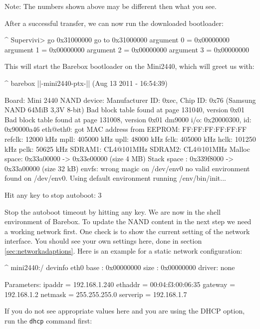 Note: The numbers shown above may be different then what you see.

After a successful transfer, we can now run the downloaded bootloader:

\begin{ptxshell}[escapechar=|]{^}
Supervivi>  go 0x31000000
go to 0x31000000
  argument 0 = 0x00000000
  argument 1 = 0x00000000
  argument 2 = 0x00000000
  argument 3 = 0x00000000
\end{ptxshell}

This will start the Barebox bootloader on the Mini2440, which will
greet us with:

\begin{ptxshell}[escapechar=|]{^}
barebox |\ptxBareboxRev |-mini2440-ptx-|\releasenumber| (Aug 13 2011 - 16:54:39)

Board: Mini 2440
NAND device: Manufacturer ID: 0xec, Chip ID: 0x76 (Samsung NAND 64MiB 3,3V 8-bit)
Bad block table found at page 131040, version 0x01
Bad block table found at page 131008, version 0x01
dm9000 i/o: 0x20000300, id: 0x90000a46
eth@eth0: got MAC address from EEPROM: FF:FF:FF:FF:FF:FF
refclk:    12000 kHz
mpll:     405000 kHz
upll:      48000 kHz
fclk:     405000 kHz
hclk:     101250 kHz
pclk:      50625 kHz
SDRAM1:   CL4@101MHz
SDRAM2:   CL4@101MHz
Malloc space: 0x33a00000 -> 0x33e00000 (size  4 MB)
Stack space : 0x339f8000 -> 0x33a00000 (size 32 kB)
envfs: wrong magic on /dev/env0
no valid environment found on /dev/env0. Using default environment
running /env/bin/init...

Hit any key to stop autoboot:  3
\end{ptxshell}

Stop the autoboot timeout by hitting any key. We are now in the shell
environment of Barebox. To update the NAND content in the next step we need
a working network first. One check is to show the current setting of the
network interface. You should see your own settings here, done in section
\ref{sec:networkadaptions}. Here is an example for a static network configuration:

\begin{ptxshell}[escapechar=|]{^}
mini2440:/ devinfo eth0
base  : 0x00000000
size  : 0x00000000
driver: none

Parameters:
          ipaddr = 192.168.1.240
         ethaddr = 00:04:f3:00:06:35
         gateway = 192.168.1.2
         netmask = 255.255.255.0
        serverip = 192.168.1.7
\end{ptxshell}

If you do not see appropriate values here and you are using the DHCP option, run
the \texttt{dhcp} command first:

